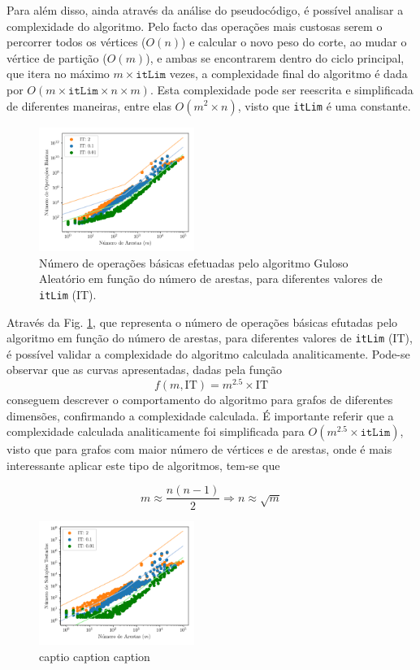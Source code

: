\documentclass[mirror, portugues]{revdetua}
\begin{document}
Para além disso, ainda através da análise do pseudocódigo, é possível analisar a complexidade do algoritmo. Pelo facto das operações mais custosas serem o percorrer todos os vértices ($O(n)$) e calcular o novo peso do corte, ao mudar o vértice de partição ($O(m)$), e ambas se encontrarem dentro do ciclo principal, que itera no máximo $m \times \texttt{itLim}$ vezes, a complexidade final do algoritmo é dada por $O(m \times \texttt{itLim} \times n \times m)$. Esta complexidade pode ser reescrita e simplificada de diferentes maneiras, entre elas $O(m^2 \times n)$, visto que \texttt{itLim} é uma constante.

\begin{figure}[H]
    \centering
    \includegraphics[width=0.45\textwidth]{../assets/ops_Random Greedy.png}
    \caption{Número de operações básicas efetuadas pelo algoritmo Guloso Aleatório em função do número de arestas, para diferentes valores de \texttt{itLim} (IT).}
    \label{fig:random_greedy}
\end{figure}

Através da Fig. \ref{fig:random_greedy}, que representa o número de operações básicas efutadas pelo algoritmo em função do número de arestas, para diferentes valores de \texttt{itLim} (IT), é possível validar a complexidade do algoritmo calculada analiticamente. Pode-se observar que as curvas apresentadas, dadas pela função $$f(m, \text{IT}) = m^{2.5} \times \text{IT}$$ conseguem descrever o comportamento do algoritmo para grafos de diferentes dimensões, confirmando a complexidade calculada. É importante referir que a complexidade calculada analiticamente foi simplificada para $O(m^{2.5} \times \texttt{itLim})$, visto que para grafos com maior número de vértices e de arestas, onde é mais interessante aplicar este tipo de algoritmos, tem-se que

$$m \approx \frac{n(n-1)}{2} \Rightarrow n \approx \sqrt{m}$$

\begin{figure}[H]
    \centering
    \includegraphics[width=0.45\textwidth]{../assets/sols_Random Greedy.png}
    \caption{captio caption caption}
    \label{fig:sols_randomgreedy}
\end{figure}
\end{document}
